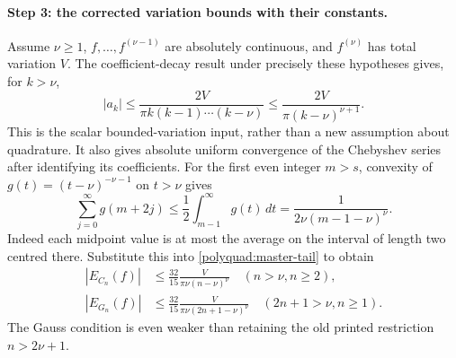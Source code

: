 \documentclass[11pt]{article}
\theoremstyle{remark}
\numberwithin{equation}{section}
\begin{document}
\paragraph{Step 3: the corrected variation bounds with their constants.}
Assume $\nu\ge1$, $f,\ldots,f^{(\nu-1)}$ are absolutely continuous,
and $f^{(\nu)}$ has total variation $V$. The coefficient-decay result
under precisely these hypotheses gives, for $k>\nu$,
\begin{equation}
 |a_k|\le\frac{2V}{\pi k(k-1)\cdots(k-\nu)}
       \le\frac{2V}{\pi(k-\nu)^{\nu+1}}.
 \label{polyquad:bv-input}
\end{equation}
This is the scalar bounded-variation input, rather than a new
assumption about quadrature. It also gives absolute uniform convergence
of the Chebyshev series after identifying its coefficients.
For the first even integer $m>s$, convexity of
$g(t)=(t-\nu)^{-\nu-1}$ on $t>\nu$ gives
\[
 \sum_{j=0}^\infty g(m+2j)
 \le\frac12\int_{m-1}^{\infty}g(t)\,dt
 =\frac1{2\nu(m-1-\nu)^\nu}.
\]
Indeed each midpoint value is at most the average on the interval of
length two centred there. Substitute this into
\eqref{polyquad:master-tail} to obtain
\begin{align}
 |E_{C_n}(f)|&\le\frac{32}{15}
       \frac{V}{\pi\nu(n-\nu)^\nu}\quad(n>\nu, n\ge2),
       \label{polyquad:cc-bv}\\
 |E_{G_n}(f)|&\le\frac{32}{15}
       \frac{V}{\pi\nu(2n+1-\nu)^\nu}\quad(2n+1>\nu, n\ge1).
       \label{polyquad:gauss-bv}
\end{align}
The Gauss condition is even weaker than retaining the old printed
restriction $n>2\nu+1$.
\end{document}
